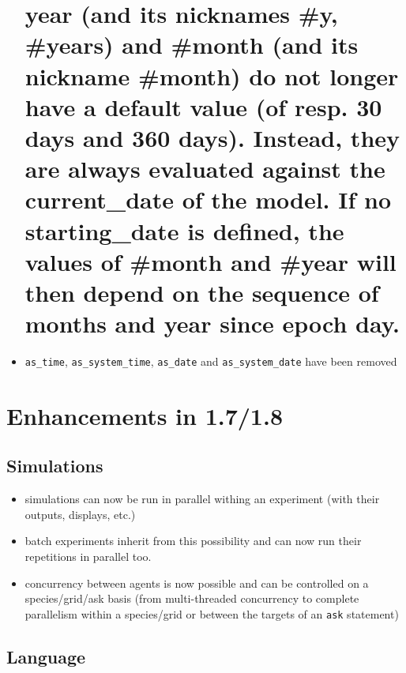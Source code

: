 \documentclass[]{book}
\providecommand{\tightlist}{%
  \setlength{\itemsep}{0pt}\setlength{\parskip}{0pt}}
\theoremstyle{definition}
\theoremstyle{definition}
\theoremstyle{definition}
\theoremstyle{remark}
\begin{document}
\begin{itemize}
  \chapter{year (and its nicknames \#y, \#years) and \#month (and its
  nickname \#month) do not longer have a default value (of resp. 30 days
  and 360 days). Instead, they are always evaluated against the
  current\_date of the model. If no starting\_date is defined, the
  values of \#month and \#year will then depend on the sequence of
  months and year since epoch
  day.}\label{year-and-its-nicknames-y-years-and-month-and-its-nickname-month-do-not-longer-have-a-default-value-of-resp.-30-days-and-360-days.-instead-they-are-always-evaluated-against-the-current_date-of-the-model.-if-no-starting_date-is-defined-the-values-of-month-and-year-will-then-depend-on-the-sequence-of-months-and-year-since-epoch-day.}
\item
  \texttt{as\_time}, \texttt{as\_system\_time}, \texttt{as\_date} and
  \texttt{as\_system\_date} have been removed
\end{itemize}

\chapter{Enhancements in 1.7/1.8}\label{enhancements-in-1.71.8}

\section{Simulations}\label{simulations}

\begin{itemize}
\tightlist
\item
  simulations can now be run in parallel withing an experiment (with
  their outputs, displays, etc.)
\item
  batch experiments inherit from this possibility and can now run their
  repetitions in parallel too.
\item
  concurrency between agents is now possible and can be controlled on a
  species/grid/ask basis (from multi-threaded concurrency to complete
  parallelism within a species/grid or between the targets of an
  \texttt{ask} statement)
\end{itemize}

\section{Language}\label{language}
\end{document}
